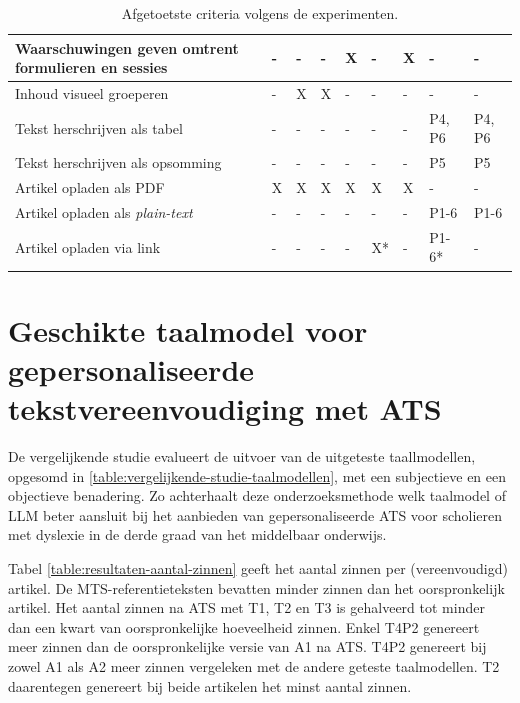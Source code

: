 \begin{table}[H]
\begin{tabular}{ | m{8cm} | m{0.5cm} | m{0.5cm} | m{0.5cm} | m{0.5cm} | m{0.5cm} | m{0.5cm} | m{1cm} | m{1cm} | }
		Waarschuwingen geven omtrent formulieren en sessies & - & - & - & X & - & X & - & - \\ \hline
		Inhoud visueel groeperen & - & X & X & - & - & - & - & - \\ \hline
		Tekst herschrijven als tabel & - & - & - & - & - & - & P4, P6 & P4, P6 \\ \hline
		Tekst herschrijven als opsomming & - & - & - & - & - & - & P5 & P5 \\ \hline
		Artikel opladen als PDF & X & X & X & X & X & X & - & - \\ \hline
		Artikel opladen als \textit{plain-text} & - & - & - & - & - & - & P1-6 & P1-6 \\ \hline
		Artikel opladen via link & - & - & - & - & X* & - & P1-6* & - \\ \hline
	\end{tabular}
	\caption{Afgetoetste criteria volgens de experimenten.}
	\label{table:afgetoetste-criteria}
\end{table}


\section{Geschikte taalmodel voor gepersonaliseerde tekstvereenvoudiging met ATS}

De vergelijkende studie evalueert de uitvoer van de uitgeteste taallmodellen, opgesomd in \ref{table:vergelijkende-studie-taalmodellen}, met een subjectieve en een objectieve benadering. Zo achterhaalt deze onderzoeksmethode welk taalmodel of LLM beter aansluit bij het aanbieden van gepersonaliseerde ATS voor scholieren met dyslexie in de derde graad van het middelbaar onderwijs. 

\medspace

Tabel \ref{table:resultaten-aantal-zinnen} geeft het aantal zinnen per (vereenvoudigd) artikel. De MTS-referentieteksten bevatten minder zinnen dan het oorspronkelijk artikel. Het aantal zinnen na ATS met T1, T2 en T3 is gehalveerd tot minder dan een kwart van oorspronkelijke hoeveelheid zinnen. Enkel T4P2 genereert meer zinnen dan de oorspronkelijke versie van A1 na ATS. T4P2 genereert bij zowel A1 als A2 meer zinnen vergeleken met de andere geteste taalmodellen. T2 daarentegen genereert bij beide artikelen het minst aantal zinnen.

\medspace


